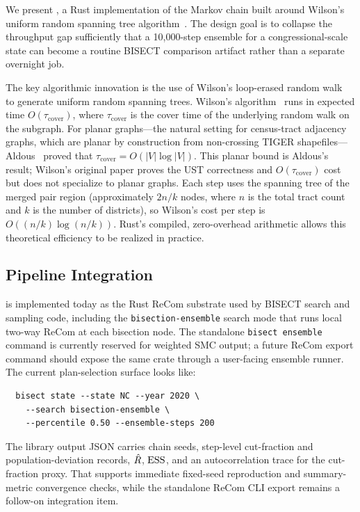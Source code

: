 We present \re{}, a Rust implementation of the \recom{} Markov chain
built around Wilson's uniform random spanning tree
algorithm~\citep{wilson1996generating}.
The design goal is to collapse the throughput gap sufficiently that
a 10{,}000-step ensemble for a congressional-scale state can become a
routine BISECT comparison artifact rather than a separate overnight job.

The key algorithmic innovation is the use of Wilson's loop-erased random
walk~\citep{lawler1980loop} to generate uniform random spanning trees.
Wilson's algorithm~\citep{wilson1996generating} runs in expected time
$O(\tau_{\mathrm{cover}})$, where $\tau_{\mathrm{cover}}$ is the
cover time of the underlying random walk on the subgraph.
For planar graphs---the natural setting for census-tract adjacency
graphs, which are planar by construction from non-crossing TIGER
shapefiles---Aldous~\citeyearpar{aldous1991random} proved that
$\tau_{\mathrm{cover}} = O(|V|\log|V|)$.
This planar bound is Aldous's result; Wilson's original paper proves the
UST correctness and $O(\tau_{\mathrm{cover}})$ cost but does not specialize
to planar graphs.
Each \recom{} step uses the spanning tree of the merged pair region
(approximately $2n/k$ nodes, where $n$ is the total tract count and $k$
is the number of districts), so Wilson's cost per step is
$O((n/k)\log(n/k))$.
Rust's compiled, zero-overhead arithmetic allows this theoretical
efficiency to be realized in practice.

\subsection{Pipeline Integration}

\re{} is implemented today as the Rust ReCom substrate used by
BISECT search and sampling code, including the \texttt{bisection-ensemble}
search mode that runs local two-way ReCom at each bisection node.
The standalone \texttt{bisect ensemble} command is currently reserved for
weighted SMC output; a future ReCom export command should expose the same
crate through a user-facing ensemble runner.
The current plan-selection surface looks like:

\begin{verbatim}
  bisect state --state NC --year 2020 \
    --search bisection-ensemble \
    --percentile 0.50 --ensemble-steps 200
\end{verbatim}

The library output JSON carries chain seeds, step-level cut-fraction and
population-deviation records, $\hat{R}$, $\mathrm{ESS}$, and an autocorrelation trace
for the cut-fraction proxy. That supports immediate fixed-seed reproduction
and summary-metric convergence checks, while the standalone ReCom CLI export
remains a follow-on integration item.

